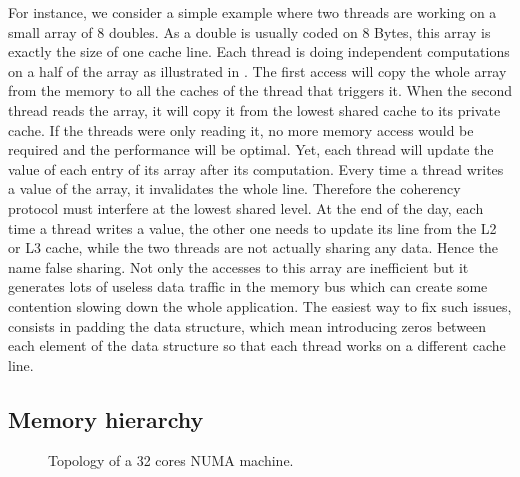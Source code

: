 For instance, we  consider a simple example where two threads are working on a small array of $8$ doubles.
As a double is usually coded on $8$ Bytes, this array is exactly the size of one cache line.
Each thread is doing independent computations on a half of the array as illustrated in .
The first access will copy the whole array from the memory to all the caches of the thread that triggers it.
When the second thread reads the array, it will copy it from the lowest shared cache to its private cache.
If the threads were only reading it, no more memory access would be required and the performance will be optimal.
Yet, each thread will update the value of each entry of its array after its computation.
Every time a thread writes a value of the array, it invalidates the whole line.
Therefore the coherency protocol must interfere at the lowest shared level.
At the end of the day, each time a thread writes a value, the other one needs to update its line from the L2 or L3 cache, while the two threads are not actually sharing any data.
Hence the name false sharing.
Not only the accesses to this array are inefficient but it generates lots of useless data traffic in the memory bus which can create some contention slowing down the whole application.
The easiest way to fix such issues, consists in padding the data structure, which mean introducing zeros between each element of the data structure so that each thread works on a different cache line.

\subsection{Memory hierarchy}

\begin{figure}[htb]
    \centering
    
    \caption{Topology of a 32 cores NUMA machine.}
    \label{fig:topo-NUMA}
\end{figure}


